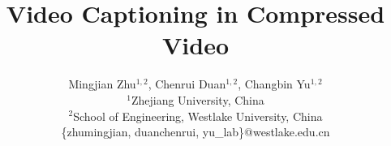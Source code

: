 \documentclass[a4paper,conference]{IEEEtran}
\begin{document}
%
\title{Video Captioning in Compressed Video}





\author{
	Mingjian Zhu$^{1,2}$, Chenrui Duan$^{1,2}$, Changbin Yu$^{1,2}$\\
		\normalsize $^1$Zhejiang University, China\\
			\normalsize $^2$School of Engineering, Westlake University, China \\
			\normalsize \{zhumingjian, duanchenrui, yu\_lab\}@westlake.edu.cn\\		
	}

	
\maketitle

%



%
\end{document}
